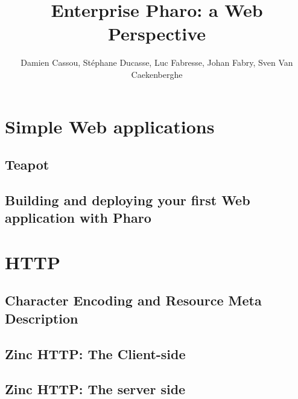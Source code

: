 \documentclass[10pt,twoside]{support/latex/sbabook}
\begin{document}
\frontmatter
\author{Damien Cassou, Stéphane Ducasse, Luc Fabresse, Johan Fabry, Sven Van Caekenberghe}
\title{Enterprise Pharo: a Web Perspective}
\maketitle
\tableofcontents

\sloppy %
\mainmatter



\part{Simple Web applications}

\chapter{Teapot}



\chapter{Building and deploying your first Web application with Pharo}



\part{HTTP}

\chapter{Character Encoding and Resource Meta Description}




\chapter{Zinc HTTP: The Client-side}


\chapter{Zinc HTTP: The server side}

\end{document}

